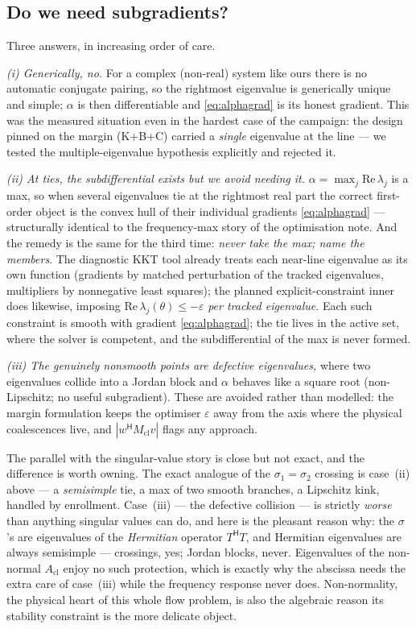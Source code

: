 \documentclass[11pt,a4paper]{article}
\newcommand{\eps}{\varepsilon}
\newcommand{\Mcl}{M_{\mathrm{cl}}}
\newcommand{\Acl}{A_{\mathrm{cl}}}
\newcommand{\hp}{^{\mathsf H}}
\begin{document}
{\subsection{Do we need subgradients?}
Three answers, in increasing order of care.

\emph{(i) Generically, no.}  For a complex (non-real) system like ours there is no
automatic conjugate pairing, so the rightmost eigenvalue is generically unique and simple;
$\alpha$ is then differentiable and \eqref{eq:alphagrad} is its honest gradient.  This was
the measured situation even in the hardest case of the campaign: the design pinned on the
margin (K+B+C) carried a \emph{single} eigenvalue at the line --- we tested the
multiple-eigenvalue hypothesis explicitly and rejected it.

\emph{(ii) At ties, the subdifferential exists but we avoid needing it.}
$\alpha=\max_j\mathrm{Re}\,\lambda_j$ is a max, so when several eigenvalues tie at the
rightmost real part the correct first-order object is the convex hull of their individual
gradients \eqref{eq:alphagrad} --- structurally identical to the frequency-max story of
the optimisation note.  And the remedy is the same for the third time: \emph{never take
the max; name the members}.  The diagnostic KKT tool already treats each near-line
eigenvalue as its own function (gradients by matched perturbation of the tracked
eigenvalues, multipliers by nonnegative least squares); the planned explicit-constraint
inner does likewise, imposing $\mathrm{Re}\,\lambda_j(\theta)\le-\eps$ \emph{per tracked
eigenvalue}.  Each such constraint is smooth with gradient \eqref{eq:alphagrad}; the tie
lives in the active set, where the solver is competent, and the subdifferential of the max
is never formed.

\emph{(iii) The genuinely nonsmooth points are defective eigenvalues,} where two
eigenvalues collide into a Jordan block and $\alpha$ behaves like a square root
(non-Lipschitz; no useful subgradient).  These are avoided rather than modelled: the
margin formulation keeps the optimiser $\eps$ away from the axis where the physical
coalescences live, and $|w\hp\Mcl v|$ flags any approach.

The parallel with the singular-value story is close but not exact, and the difference is
worth owning.  The exact analogue of the
$\sigma_1=\sigma_2$ crossing is case~(ii) above --- a \emph{semisimple} tie, a max of two
smooth branches, a Lipschitz kink, handled by enrollment.  Case~(iii) --- the defective
collision --- is strictly \emph{worse} than anything singular values can do, and here is
the pleasant reason why: the $\sigma$'s are eigenvalues of the \emph{Hermitian} operator
$T\hp T$, and Hermitian eigenvalues are always semisimple --- crossings, yes; Jordan
blocks, never.  Eigenvalues of the non-normal $\Acl$ enjoy no such protection, which is
exactly why the abscissa needs the extra care of case~(iii) while the frequency response
never does.  Non-normality, the physical heart of this whole flow problem, is also the
algebraic reason its stability constraint is the more delicate object.

}
\end{document}
